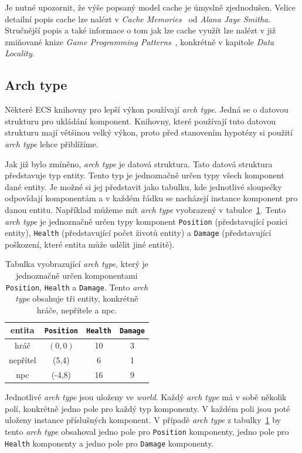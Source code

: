 Je nutné upozornit, že výše popsaný model cache je úmyslně zjednodušen. Velice detailní popis cache lze nalézt v \textit{Cache Memories}~\cite{10.1145/356887.356892} od \textit{Alana Jaye Smitha}. Stručnější popis a také informace o tom jak lze cache využít lze nalézt v již zmiňované knize \textit{Game Programming Patterns}~\cite{nystrom2014game}, konkrétně v kapitole \textit{Data Locality}. 

\subsection{Arch type}
Některé ECS knihovny pro lepší výkon používají \textit{arch type}. Jedná se o datovou strukturu pro ukládání komponent. Knihovny, které používají tuto datovou strukturu mají většinou velký výkon, proto před stanovením hypotézy si použití \textit{arch type} lehce přiblížíme.

Jak již bylo zmíněno, \textit{arch type} je datová struktura. Tato datová struktura představuje typ entity. Tento typ je jednoznačně určen typy všech komponent dané entity. Je možné si jej představit jako tabulku, kde jednotlivé sloupečky odpovídají komponentám a v každém řádku se nacházejí instance komponent pro danou entitu. Například můžeme mít \textit{arch type} vyobrazený v tabulce~\ref{tab:arch-type}. Tento \textit{arch type} je jednoznačně určen typy komponent \texttt{Position} (představující pozici entity), \texttt{Health} (představující počet životů entity) a \texttt{Damage} (představující poškození, které entita může udělit jiné entitě).

\begin{table}[!htb]
    \centering\footnotesize\sf
    \begin{tabular}{c c c c}
        \toprule
        entita & \texttt{Position} & \texttt{Health} & \texttt{Damage} \\
        \midrule
        hráč & $(0,0)$ & 10 & 3 \\
        nepřítel & (5,4) & 6 & 1 \\
        npc & (-4,8) & 16 & 9\\
        \bottomrule
    \end{tabular}
    \caption{Tabulka vyobrazující \textit{arch type}, který je jednoznačně určen komponentami \texttt{Position}, \texttt{Health} a \texttt{Damage}. Tento \textit{arch type} obsahuje tři entity, konkrétně hráče, nepřítele a npc.}
    \label{tab:arch-type}
\end{table}

Jednotlivé \textit{arch type} jsou uloženy ve \textit{world}. Každý \textit{arch type} má v sobě několik polí, konkrétně jedno pole pro každý typ komponenty. V každém poli jsou poté uloženy instance příslušných komponent. V případě \textit{arch type} z tabulky~\ref{tab:arch-type} by tento \textit{arch type} obsahoval jedno pole pro \texttt{Position} komponenty, jedno pole pro \texttt{Health} komponenty a jedno pole pro \texttt{Damage} komponenty.

